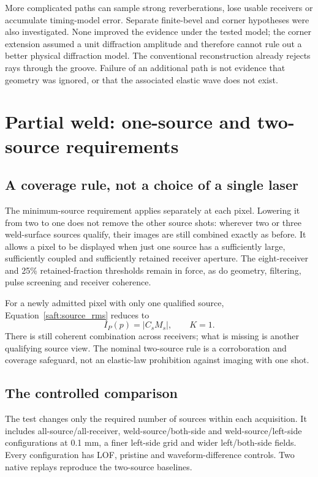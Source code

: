 \documentclass[11pt]{article}
\begin{document}
More complicated paths can sample strong reverberations, lose usable receivers or accumulate timing-model error. Separate finite-bevel and corner hypotheses were also investigated. None improved the evidence under the tested model; the corner extension assumed a unit diffraction amplitude and therefore cannot rule out a better physical diffraction model. The conventional reconstruction already rejects rays through the groove. Failure of an additional path is not evidence that geometry was ignored, or that the associated elastic wave does not exist.


\section{Partial weld: one-source and two-source requirements}
\label{saft:archive:partial:one_source}
\subsection{A coverage rule, not a choice of a single laser}
The minimum-source requirement applies separately at each pixel. Lowering it from two to one does not remove the other source shots: wherever two or three weld-surface sources qualify, their images are still combined exactly as before. It allows a pixel to be displayed when just one source has a sufficiently large, sufficiently coupled and sufficiently retained receiver aperture. The eight-receiver and 25\% retained-fraction thresholds remain in force, as do geometry, filtering, pulse screening and receiver coherence.

For a newly admitted pixel with only one qualified source, Equation~\ref{saft:source_rms} reduces to
\begin{equation}
 I_P(p)=|C_sM_s|,\qquad K=1.
\end{equation}
There is still coherent combination across receivers; what is missing is another qualifying source view. The nominal two-source rule is a corroboration and coverage safeguard, not an elastic-law prohibition against imaging with one shot.

\subsection{The controlled comparison}
The test changes only the required number of sources within each acquisition. It includes all-source/all-receiver, weld-source/both-side and weld-source/left-side configurations at 0.1 mm, a finer left-side grid and wider left/both-side fields. Every configuration has LOF, pristine and waveform-difference controls. Two native replays reproduce the two-source baselines.
\end{document}

